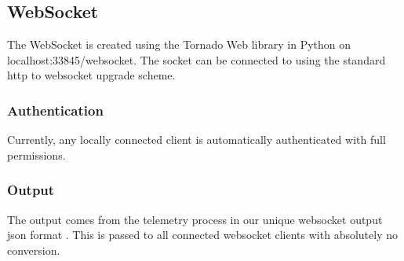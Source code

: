 \subsectionfont{\fontsize{14}{14}\selectfont}

\subsection{WebSocket}

The WebSocket is created using the Tornado Web library in Python on localhost:33845/websocket. 
The socket can be connected to using the standard http to websocket upgrade scheme.

\subsubsection{Authentication}
Currently, any locally connected client is automatically authenticated with full permissions.

\subsubsection{Output}
The output comes from the telemetry process in our unique websocket output json format \cite{websocket_format}. This is passed to all connected websocket clients with absolutely no conversion.